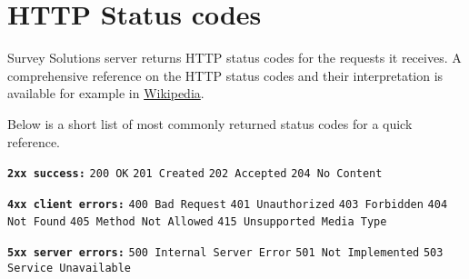 \section{HTTP Status codes}

Survey Solutions server returns HTTP status codes for
the requests it receives. A comprehensive reference on the
HTTP status codes and their interpretation is available for
example in \href{https://en.wikipedia.org/wiki/List_of_HTTP_status_codes}{Wikipedia}.

Below is a short list of most commonly returned status codes for a quick reference.\newline

  \texttt{\textbf{2xx success:}}\newline
  \texttt{200 OK}\newline
  \texttt{201 Created}\newline
  \texttt{202 Accepted}\newline
  \texttt{204 No Content}\newline

  \texttt{\textbf{4xx client errors:}}\newline
  \texttt{400 Bad Request}\newline
  \texttt{401 Unauthorized}\newline
  \texttt{403 Forbidden}\newline
  \texttt{404 Not Found}\newline
  \texttt{405 Method Not Allowed}\newline
  \texttt{415 Unsupported Media Type}\newline

  \texttt{\textbf{5xx server errors:}}\newline
  \texttt{500 Internal Server Error}\newline
  \texttt{501 Not Implemented}\newline
  \texttt{503 Service Unavailable}\newline

